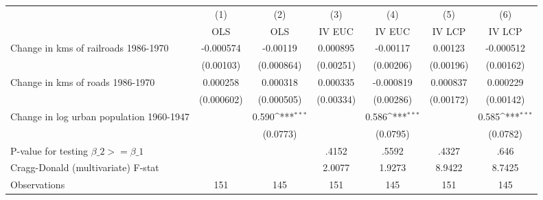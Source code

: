 {
\def\sym#1{\ifmmode^{#1}\else\(^{#1}\)\fi}
\begin{tabular}{l*{6}{c}}
\hline\hline
                &\multicolumn{1}{c}{(1)}&\multicolumn{1}{c}{(2)}&\multicolumn{1}{c}{(3)}&\multicolumn{1}{c}{(4)}&\multicolumn{1}{c}{(5)}&\multicolumn{1}{c}{(6)}\\
                &\multicolumn{1}{c}{OLS}&\multicolumn{1}{c}{OLS}&\multicolumn{1}{c}{IV EUC}&\multicolumn{1}{c}{IV EUC}&\multicolumn{1}{c}{IV LCP}&\multicolumn{1}{c}{IV LCP}\\
\hline
Change in kms of railroads 1986-1970&-0.000574         & -0.00119         & 0.000895         & -0.00117         &  0.00123         &-0.000512         \\
                &(0.00103)         &(0.000864)         &(0.00251)         &(0.00206)         &(0.00196)         &(0.00162)         \\
[1em]
Change in kms of roads 1986-1970& 0.000258         & 0.000318         & 0.000335         &-0.000819         & 0.000837         & 0.000229         \\
                &(0.000602)         &(0.000505)         &(0.00334)         &(0.00286)         &(0.00172)         &(0.00142)         \\
[1em]
Change in log urban population 1960-1947&                  &    0.590\sym{***}&                  &    0.586\sym{***}&                  &    0.585\sym{***}\\
                &                  & (0.0773)         &                  & (0.0795)         &                  & (0.0782)         \\
\hline
P-value for testing $\beta\_{2} >= \beta\_{1}$&                  &                  &    .4152         &    .5592         &    .4327         &     .646         \\
Cragg-Donald (multivariate) F-stat&                  &                  &   2.0077         &   1.9273         &   8.9422         &   8.7425         \\
Observations    &      151         &      145         &      151         &      145         &      151         &      145         \\
\hline\hline
\end{tabular}
}
